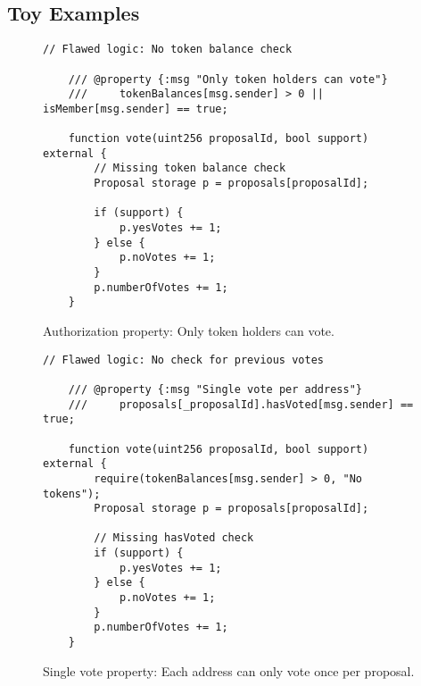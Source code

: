\documentclass[conference]{IEEEtran}
\begin{document}
\subsection{Toy Examples}

\begin{figure}[h]
\centering
\begin{lstlisting}[basicstyle=\ttfamily\small,breaklines=true]
    // Flawed logic: No token balance check
    
    /// @property {:msg "Only token holders can vote"} 
    ///     tokenBalances[msg.sender] > 0 || isMember[msg.sender] == true;
    
    function vote(uint256 proposalId, bool support) external {
        // Missing token balance check
        Proposal storage p = proposals[proposalId];
        
        if (support) {
            p.yesVotes += 1;
        } else {
            p.noVotes += 1;
        }
        p.numberOfVotes += 1;
    }
\end{lstlisting}
\caption{Authorization property: Only token holders can vote.}
\label{fig:auth_property}
\end{figure}

\begin{figure}[h]
\centering
\begin{lstlisting}[basicstyle=\ttfamily\small,breaklines=true]
    // Flawed logic: No check for previous votes
    
    /// @property {:msg "Single vote per address"} 
    ///     proposals[_proposalId].hasVoted[msg.sender] == true;
    
    function vote(uint256 proposalId, bool support) external {
        require(tokenBalances[msg.sender] > 0, "No tokens");
        Proposal storage p = proposals[proposalId];
        
        // Missing hasVoted check
        if (support) {
            p.yesVotes += 1;
        } else {
            p.noVotes += 1;
        }
        p.numberOfVotes += 1;
    }
\end{lstlisting}
\caption{Single vote property: Each address can only vote once per proposal.}
\label{fig:single_vote_property}
\end{figure}
\end{document}
